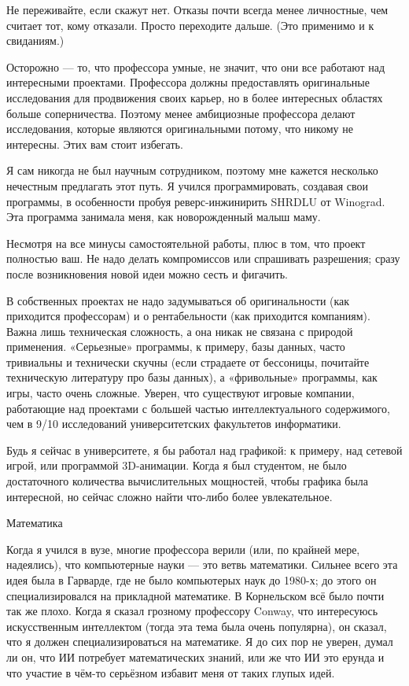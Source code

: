 \documentclass[ebook,12pt,oneside,openany]{memoir}
\begin{document}
Не переживайте, если скажут нет. Отказы почти всегда менее личностные,
чем считает тот, кому отказали. Просто переходите дальше. (Это
применимо и к свиданиям.)

Осторожно — то, что профессора умные, не значит, что они все работают
над интересными проектами. Профессора должны предоставлять
оригинальные исследования для продвижения своих карьер, но в более
интересных областях больше соперничества. Поэтому менее амбициозные
профессора делают исследования, которые являются оригинальными потому,
что никому не интересны. Этих вам стоит избегать.

Я сам никогда не был научным сотрудником, поэтому мне кажется
несколько нечестным предлагать этот путь. Я учился программировать,
создавая свои программы, в особенности пробуя реверс-инжинирить SHRDLU
от Winograd. Эта программа занимала меня, как новорожденный малыш
маму.

Несмотря на все минусы самостоятельной работы, плюс в том, что проект
полностью ваш. Не надо делать компромиссов или спрашивать разрешения;
сразу после возникновения новой идеи можно сесть и фигачить.

В собственных проектах не надо задумываться об оригинальности (как
приходится профессорам) и о рентабельности (как приходится компаниям).
Важна лишь техническая сложность, а она никак не связана с природой
применения. «Серьезные» программы, к примеру, базы данных, часто
тривиальны и технически скучны (если страдаете от бессоницы, почитайте
техническую литературу про базы данных), а «фривольные» программы, как
игры, часто очень сложные. Уверен, что существуют игровые компании,
работающие над проектами с большей частью интеллектуального
содержимого, чем в 9/10 исследований университетских факультетов
информатики.

Будь я сейчас в университете, я бы работал над графикой: к примеру,
над сетевой игрой, или программой 3D-анимации. Когда я был студентом,
не было достаточного количества вычислительных мощностей, чтобы
графика была интересной, но сейчас сложно найти что-либо более
увлекательное.

Математика

Когда я учился в вузе, многие профессора верили (или, по крайней мере,
надеялись), что компьютерные науки — это ветвь математики. Сильнее
всего эта идея была в Гарварде, где не было компьютерых наук до
1980-х; до этого он специализировался на прикладной математике. В
Корнельском всё было почти так же плохо. Когда я сказал грозному
профессору Conway, что интересуюсь искусственным интеллектом (тогда
эта тема была очень популярна), он сказал, что я должен
специализироваться на математике. Я до сих пор не уверен, думал ли он,
что ИИ потребует математических знаний, или же что ИИ это ерунда и что
участие в чём-то серьёзном избавит меня от таких глупых идей.
\end{document}
